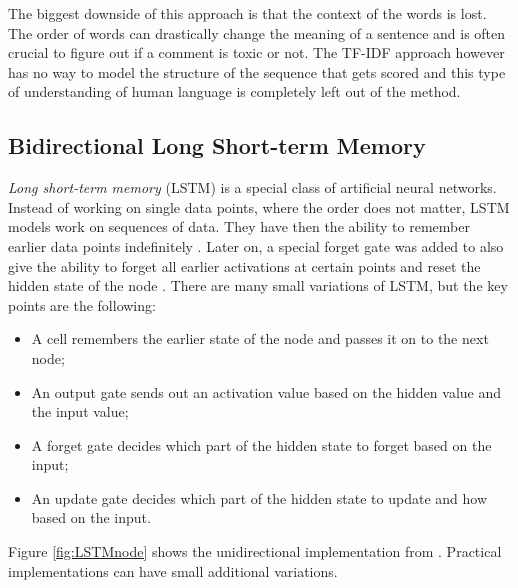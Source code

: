 \documentclass[nofilelist]{cslthse-msc}
\begin{document}
 The biggest downside of this approach is that the context of the words is lost.  The order of words can drastically change the meaning of a sentence and is often crucial to figure out if a comment is toxic or not. The TF-IDF approach however has no way to model the structure of the sequence that gets scored and this type of understanding of human language is completely left out of the method.



\subsection{Bidirectional Long Short-term Memory}

\emph{Long short-term memory} (LSTM) is a special class of artificial neural networks. Instead of working on single data points, where the order does not matter, LSTM models work on sequences of data. They have then the ability to remember earlier data points indefinitely \citep{971021502119971115}. Later on, a special forget gate was added to also give the ability to forget all earlier activations at certain points and reset the hidden state of the node \citep{gers1999learning}. There are many small variations of LSTM, but the key points are the following:

\begin{itemize}
    \item A cell remembers the earlier state of the node and passes it on to the next node;
    \item An output gate sends out an activation value based on the hidden value and the input value;
    \item A forget gate decides which part of the hidden state to forget based on the input;
    \item An update gate decides which part of the hidden state to update and how based on the input.
\end{itemize}

Figure \ref{fig:LSTMnode} shows the unidirectional implementation from \citet{gers1999learning}. Practical implementations can have small additional variations.
\end{document}
